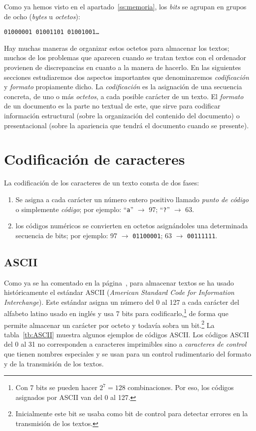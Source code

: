 Como ya hemos visto en el apartado~\ref{ss:memoria}, los \emph{bits} se agrupan en grupos de ocho (\emph{bytes} u \emph{octetos}): \begin{center} \texttt{01000001 01001101 01001001\ldots} \end{center} 

Hay muchas maneras de organizar estos octetos para almacenar los textos; muchos de los problemas que aparecen cuando se tratan textos con el ordenador provienen de discrepancias en cuanto a la manera de hacerlo. 
En las siguientes secciones estudiaremos dos aspectos importantes que denominaremos \emph{codificación} y \emph{formato} propiamente dicho. La \emph{codificación} es la asignación de una secuencia concreta, de uno o más \emph{octetos}, a cada posible carácter de un texto. El \emph{formato} de un documento es la parte no textual de este, que sirve para codificar información estructural (sobre la organización del contenido del documento) o presentacional (sobre la apariencia que tendrá el documento cuando se presente). 

\section{Codificación de caracteres} La codificación de los caracteres de un texto consta de dos fases: \begin{enumerate} \item Se asigna a cada carácter un número entero positivo llamado \emph{punto de código} o simplemente \emph{código}; por ejemplo: ``\texttt{a}'' $\to$ 97; ``\texttt{?}'' $\to$ 63. \item los códigos numéricos se convierten en octetos asignándoles una determinada secuencia de bits; por ejemplo: 97 $\to$ \texttt{01100001}; 63 $\to$ \texttt{00111111}. 

\end{enumerate} 

\subsection{ASCII} Como ya se ha comentado en la página~\pageref{pg:ASCII}, para almacenar textos se ha usado históricamente el estándar ASCII (\emph{American Standard Code for Information Interchange}). Este estándar asigna un número del 0 al 127 a cada carácter del alfabeto latino usado en inglés y usa 7 bits para codificarlo,\footnote{Con 7 bits se pueden hacer $2^7=128$ combinaciones. Por eso, los códigos asignados por ASCII van del 0 al 127.} de forma que permite almacenar un carácter por octeto y todavía sobra un bit.\footnote{Inicialmente este bit se usaba como bit de control para detectar errores en la transmisión de los textos.} La tabla~\ref{tb:ASCII} muestra algunos ejemplos de códigos ASCII. Los códigos ASCII del 0 al 31 no corresponden a caracteres imprimibles sino a \emph{caracteres de control} que tienen nombres especiales y se usan para un control rudimentario del formato y de la transmisión de los textos. 

